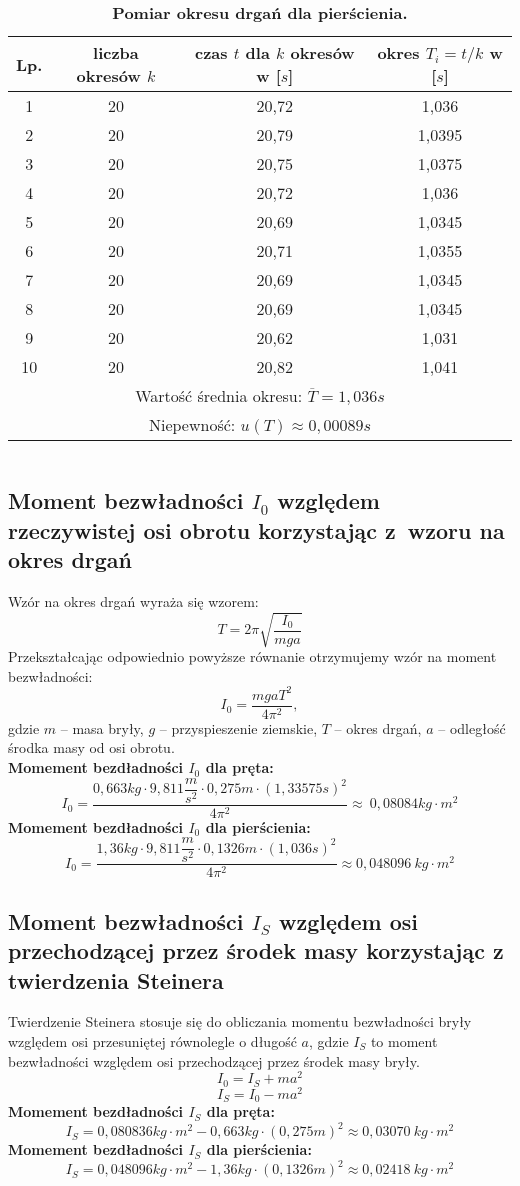 \documentclass[a4paper,11pt]{article}
\begin{document}
\begin{table}[!ht]
\vspace*{0.5 cm}
\centering
\setlength{\extrarowheight}{2pt}
\caption{\textbf{Pomiar okresu drgań dla pierścienia.}}
\begin{tabular}{|c|c|c|c|}
\hline
Lp. & liczba okresów $k$ & czas $t$ dla $k$ okresów w [$s$] & okres $T_{i}=t/k$ w [$s$] \\ \hline
1 & 20 & 20,72 & 1,036\\ \hline
2 & 20 & 20,79 & 1,0395\\ \hline
3 & 20 & 20,75 & 1,0375\\ \hline
4 & 20 & 20,72 & 1,036\\ \hline
5 & 20 & 20,69 & 1,0345\\ \hline
6 & 20 & 20,71 & 1,0355\\ \hline
7 & 20 & 20,69 & 1,0345\\ \hline
8 & 20 & 20,69 & 1,0345\\ \hline
9 & 20 & 20,62 & 1,031\\ \hline
10 & 20 & 20,82 & 1,041\\ \hline
\multicolumn{4}{|c|}{Wartość średnia okresu: $\overline{T}= 1,036s$} \\ \hline
\multicolumn{4}{|c|}{Niepewność: $u(T)\approx 0,00089s$} \\ \hline
\end{tabular}
\end{table}
$$$$
\subsection{Moment bezwładności $I_{0}$ względem rzeczywistej osi obrotu korzystając z~wzoru na okres drgań}
Wzór na okres drgań wyraża się wzorem:
$$T=2\pi\sqrt{\dfrac{I_{0}}{mga}}$$
Przekształcając odpowiednio powyższe równanie otrzymujemy wzór na moment bezwładności:
$$I_{0}=\dfrac{mgaT^{2}}{4\pi^{2}},$$
gdzie $m$ -- masa bryły, $g$ -- przyspieszenie ziemskie, $T$ -- okres drgań, $a$ -- odległość środka masy od osi obrotu.
$$$$
\textbf{Momement bezdładności $I_{0}$ dla pręta:}
$$I_{0} = \dfrac{0,663kg\cdot 9,811\dfrac{m}{s^{2}}\cdot 0,275m \cdot (1,33575s)^{2}}{4\pi^{2}}\approx ~0,08084 kg \cdot m^{2}$$
\textbf{Momement bezdładności $I_{0}$ dla pierścienia:}
$$I_{0} = \dfrac{1,36kg\cdot 9,811\dfrac{m}{s^{2}}\cdot 0,1326m \cdot (1,036s)^{2}}{4\pi^{2}}\approx 0,048096~ kg \cdot m^{2}$$

\subsection{Moment bezwładności $I_{S}$ względem osi przechodzącej przez środek masy korzystając z twierdzenia Steinera}
Twierdzenie Steinera stosuje się do obliczania momentu bezwładności bryły względem osi przesuniętej równolegle o długość $a$, gdzie $I_{S}$ to moment bezwładności względem osi przechodzącej przez środek masy bryły.
$$I_{0}=I_{S}+ma^{2}$$
$$I_{S}=I_{0}-ma^{2}$$
\textbf{Momement bezdładności $I_{S}$ dla pręta:
}$$I_{S} =0,080836 kg \cdot m^{2} - 0,663kg\cdot (0,275m)^{2}\approx 0,03070~kg \cdot m^{2}$$
\textbf{Momement bezdładności $I_{S}$ dla pierścienia:
}$$I_{S} = 0,048096 kg \cdot m^{2} - 1,36kg\cdot (0,1326m)^{2}\approx 0,02418~kg \cdot m^{2}$$
\end{document}
